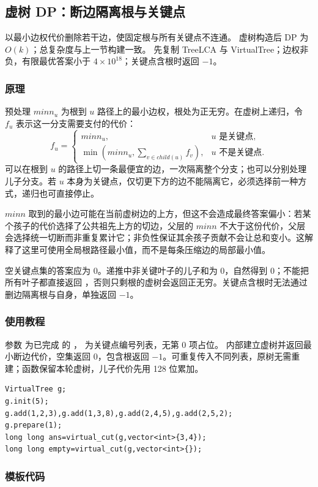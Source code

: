 \subsection{虚树 DP：断边隔离根与关键点}
\label{tree:virtual-cut}
\AlgorithmInfo
    {以最小边权代价删除若干边，使固定根与所有关键点不连通。}
    {虚树构造后 DP 为 $O(k)$；总复杂度与上一节构建一致。}
    {先复制 TreeLCA 与 VirtualTree；边权非负，有限最优答案小于 $4\times10^{18}$；关键点含根时返回 $-1$。}
\subsubsection*{原理}
预处理 $minn_u$ 为根到 $u$ 路径上的最小边权，根处为正无穷。在虚树上递归，令 $f_u$ 表示这一分支需要支付的代价：
\[
    f_u=\begin{cases}
        minn_u,&u\text{ 是关键点},\\
        \min(minn_u,\sum_{v\in child(u)}f_v),&u\text{ 不是关键点}.
    \end{cases}
\]
可以在根到 $u$ 的路径上切一条最便宜的边，一次隔离整个分支；也可以分别处理儿子分支。若 $u$ 本身为关键点，仅切更下方的边不能隔离它，必须选择前一种方式，递归也可直接停止。

$minn$ 取到的最小边可能在当前虚树边的上方，但这不会造成最终答案偏小：若某个孩子的代价选择了公共祖先上方的切边，父层的 $minn$ 不大于这份代价，父层会选择统一切断而非重复累计它；非负性保证其余孩子贡献不会让总和变小。这解释了这里可使用全局根路径最小值，而不是每条压缩边的局部最小值。

空关键点集的答案应为 0。递推中非关键叶子的儿子和为 0，自然得到 0；不能把所有叶子都直接返回 ，否则只剩根的虚树会返回正无穷。关键点含根时无法通过删边隔离根与自身，单独返回 $-1$。
\subsubsection*{使用教程}
参数  为已完成  的 ， 为关键点编号列表，无第 0 项占位。 内部建立虚树并返回最小断边代价，空集返回 0，包含根返回 $-1$。可重复传入不同列表，原树无需重建；函数保留本轮虚树，儿子代价先用 128 位累加。
\begin{lstlisting}[style=mtycpp,numbers=none]
VirtualTree g;
g.init(5);
g.add(1,2,3),g.add(1,3,8),g.add(2,4,5),g.add(2,5,2);
g.prepare(1);
long long ans=virtual_cut(g,vector<int>{3,4});
long long empty=virtual_cut(g,vector<int>{});
\end{lstlisting}
\subsubsection*{模板代码}
